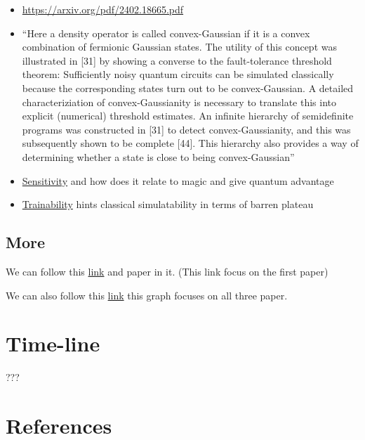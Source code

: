 \documentclass[11pt]{article}
\begin{document}
\begin{itemize}
\item \url{https://arxiv.org/pdf/2402.18665.pdf}
\item ``Here a density operator is called convex-Gaussian if it is a convex
combination of fermionic Gaussian states. The utility of this concept was
illustrated in [31] by showing a converse to the fault-tolerance threshold
theorem: Sufficiently noisy quantum circuits can be simulated classically
because the corresponding states turn out to be convex-Gaussian. A detailed
characteriziation of convex-Gaussianity is necessary to translate this into
explicit (numerical) threshold estimates. An infinite hierarchy of
semidefinite programs was constructed in [31] to detect convex-Gaussianity,
and this was subsequently shown to be complete [44]. This hierarchy also
provides a way of determining whether a state is close to being
convex-Gaussian''
\item \href{https://arxiv.org/abs/2204.12051}{Sensitivity} and how does it relate to magic and give quantum advantage
\item \href{https://www.semanticscholar.org/reader/5b06f89e5c4854e291aef2522a670b8bb00acafd}{Trainability} hints classical simulatability in terms of barren plateau
\end{itemize}
\subsection{More}
\label{sec:org55c3465}
We can follow this \href{https://www.connectedpapers.com/main/254a94aa88d2a42cbdf03af6c0520020356ee9d1/graph?utm\_source=share\_popup\&utm\_medium=copy\_link\&utm\_campaign=share\_graph}{link} and paper in it. (This link focus on the first paper)

We can also follow this \href{https://www.connectedpapers.com/main/94aef4b3f4da51a317257b710029e58e9e09fdfb+45a1272b0b318895d98825f5aa024eeaac8dcb06+ba3e7896a19e4a8722d512a04309d8d8d84ae3a0/graph?utm\_source=share\_popup\&utm\_medium=copy\_link\&utm\_campaign=share\_graph}{link} this graph focuses on all three paper.
\section{Time-line}
\label{sec:org52fda1a}

???
\section{References}
\label{sec:org0803662}
\end{document}
